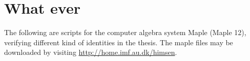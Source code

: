 \appendix
\chapter{What ever}
\label{app:A}
The following are scripts for the computer algebra system Maple (Maple 12), verifying different kind of identities in the thesis. The maple files may be downloaded by visiting \url{http://home.imf.au.dk/himsen}. 




